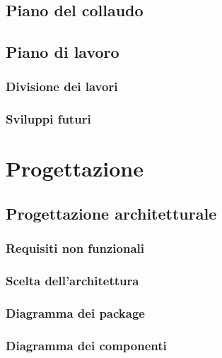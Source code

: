 \documentclass{article}
\begin{document}
\subsection{Piano del collaudo}


\subsection{Piano di lavoro}
\subsubsection{Divisione dei lavori}

\subsubsection{Sviluppi futuri}



\pagebreak
\section{Progettazione}

\subsection{Progettazione architetturale}
\subsubsection{Requisiti non funzionali}

\subsubsection{Scelta dell'architettura}

\subsubsection{Diagramma dei package}

\subsubsection{Diagramma dei componenti}

\end{document}
